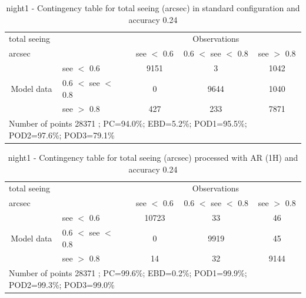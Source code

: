 \begin{table}[p!]
\begin{center}
\begin{tabular}{llccc}
\hline
{total seeing}                                       &                                                    & \multicolumn{3}{c}{Observations}                 \\
{arcsec}                                       &                             & see $<$ 0.6   & 0.6 $<$ see $<$ 0.8 & see $>$ 0.8 \\
\hline
\multicolumn{1}{c}{\multirow{3}{*}{Model data}}  & see $<$ 0.6             & 9151                & 3                       & 1042              \\
                                                 & 0.6  $<$ see $<$ 0.8 & 0                & 9644                       & 1040              \\
                                                 & see $>$ 0.8             & 427                & 233                       & 7871              \\
\hline
\multicolumn{5}{l}{ Number of points        28371 ; PC=94.0\%; EBD=5.2\%; POD1=95.5\%; POD2=97.6\%; POD3=79.1\%}
\end{tabular}
\end{center}
\caption{night1 - Contingency table for  total seeing (arcsec) in standard configuration and accuracy 0.24}
\label{tab:contingencyseeBEF:night1}
\end{table}
\begin{table}[p!]
\begin{center}
\begin{tabular}{llccc}
\hline
{total seeing}                                       &                                                    & \multicolumn{3}{c}{Observations}                 \\
{arcsec}                                       &                             & see $<$ 0.6   & 0.6 $<$ see $<$ 0.8 & see $>$ 0.8 \\
\hline
\multicolumn{1}{c}{\multirow{3}{*}{Model data}}  & see $<$ 0.6             & 10723                & 33                       & 46              \\
                                                 & 0.6  $<$ see $<$ 0.8 & 0                & 9919                       & 45              \\
                                                 & see $>$ 0.8             & 14                & 32                       & 9144              \\
\hline
\multicolumn{5}{l}{ Number of points        28371 ; PC=99.6\%; EBD=0.2\%; POD1=99.9\%; POD2=99.3\%; POD3=99.0\%}
\end{tabular}
\end{center}
\caption{night1 - Contingency table for  total seeing (arcsec) processed with AR (1H) and accuracy 0.24}
\label{tab:contingencyseeAFT:night1}
\end{table}
